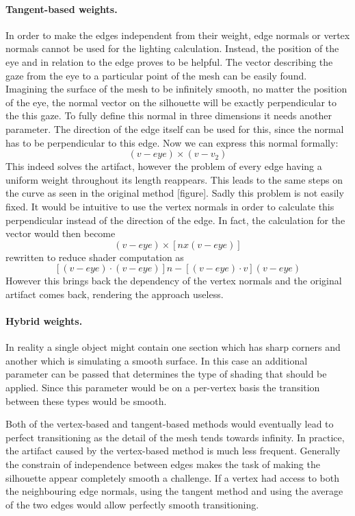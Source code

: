 \documentclass[a4paper, 12pt]{article}
\begin{document}
\paragraph{Tangent-based weights.}
In order to make the edges independent from their weight, edge normals or vertex normals cannot be used for the lighting calculation. Instead, the position of the eye and in relation to the edge proves to be helpful. The vector describing the gaze from the eye to a particular point of the mesh can be easily found. Imagining the surface of the mesh to be infinitely smooth, no matter the position of the eye, the normal vector on the silhouette will be exactly perpendicular to the this gaze. To fully define this normal in three dimensions it needs another parameter. The direction of the edge itself can be used for this, since the normal has to be perpendicular to this edge. Now we can express this normal formally:
$$(v-eye) \times (v-v_2)$$
This indeed solves the artifact, however the problem of every edge having a uniform weight throughout its length reappears.  This leads to the same steps on the curve as seen in the original method [figure]. Sadly this problem is not easily fixed. It would be intuitive to use the vertex normals in order to calculate this perpendicular instead of the direction of the edge. In fact, the calculation for the vector would then become
$$(v-eye) \times [n x (v-eye)]$$
rewritten to reduce shader computation as
$$[(v-eye) \cdot (v-eye)]n - [(v-eye) \cdot v](v-eye)$$
However this brings back the dependency of the vertex normals and the original artifact comes back, rendering the approach useless.

\paragraph{Hybrid weights.}
In reality a single object might contain one section which has sharp corners and another which is simulating a smooth surface. In this case an additional parameter can be passed that determines the type of shading that should be applied. Since this parameter would be on a per-vertex basis the transition between these types would be smooth.

Both of the vertex-based and tangent-based methods would eventually lead to perfect transitioning as the detail of the mesh tends towards infinity. In practice, the artifact caused by the vertex-based method is much less frequent. Generally the constrain of independence between edges makes the task of making the silhouette appear completely smooth a challenge. If a vertex had access to both the neighbouring edge normals, using the tangent method and using the average of the two edges would allow perfectly smooth transitioning.
\end{document}
